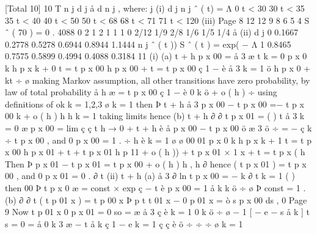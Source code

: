 \documentclass[a4paper,12pt]{article}
\begin{document}
[Total 10]
10
T
n j
d j
å d n
j
, where:
j
(i)
d j n j
ˆ ( t) =
Λ
0 \leq t < 30
30 \leq t < 35
35 \leq t < 40
40 \leq t < 50
50 \leq t < 68
68 \leq t < 71
71 \leq t < 120
(iii)
Page 8
12
12
9
8
6
5
4
S ˆ ( 70 ) = 0 . 4088
0
2
1
2
1
1
1
0
2/12
1/9
2/8
1/6
1/5
1/4
å
(ii)
d j
0
0.1667
0.2778
0.5278
0.6944
0.8944
1.1444
n j
ˆ ( t ))
S ˆ ( t ) = exp( − Λ
1
0.8465
0.7575
0.5899
0.4994
0.4088
0.3184%
11
(i) (a)
t + h
p x 00 =
å
3
æ
t
k = 0
p x 0 k h p x k + 0 t = t p x 00 h p x 00 + t = t p x 00 ç 1 −
è
å
3
k = 1
ö
h
p x 0 + kt ÷
ø
making Markov assumption, all other transitions have zero probability,
by law of total probability
å h 
æ
= t p x 00 ç 1 −
è
0 k
ö
+ o ( h ) ÷ using definitions of \mu ok k = 1,2,3
ø
k = 1
then
Þ
t + h
å
3
p x 00 − t p x 00
=− t p x 00  k + o ( h ) h
h
k = 1
taking limits
hence
(b)
t + h
∂
∂ t
p x 01 =
(
)
t
å
3
k = 0
æ
p x 00 = lim ç ç
t
h → 0 +
t + h
è
å
p x 00 − t p x 00 ö
æ 3
ö
÷ = − ç
 k ÷ t p x 00 , and 0 p x 00 = 1 .
÷
h
è k = 1
ø
ø
00
01
p x 0 k h p x k + 1 t = t p x 00 h p x 01 + t + t p x 01 h p 11
+ o ( h )) + t p x 01 × 1
x + t = t p x ( h \mu
Then
Þ
p x 01 − t p x 01
=  t p x 00 + o ( h ) h ,
h
∂
hence
( t p x 01 ) =  t p x 00 , and 0 p x 01 = 0 .
∂ t
(ii)
t + h
(a)
å
3
∂
ln t p x 00 = −  k
∂ t
k = 1
(
)
then
00
Þ t p x
0
æ
= const × exp ç − t
è
p x 00 = 1
å  k
k
ö
÷
ø
Þ const = 1 .
(b)
∂
∂ t
(
t
p
01
x
) = 
t
p
00
x
Þ p
t
t
01
x
− 0 p
01
x
= 
ò
s
p x 00 ds ,
0
Page 9%
Now
t
p
01
x
0
p x 01 = 0 so
=  æ
å
3
\mu
ç
è k = 1
0 k
ö
÷
ø
− 1
[ − e
− s å  k
]
t
s = 0
=
å 
0 k
3
æ
− t å  k
ç
1 − e k = 1
ç
ç
è
ö
÷
÷
÷
ø
k = 1
\end{document}
